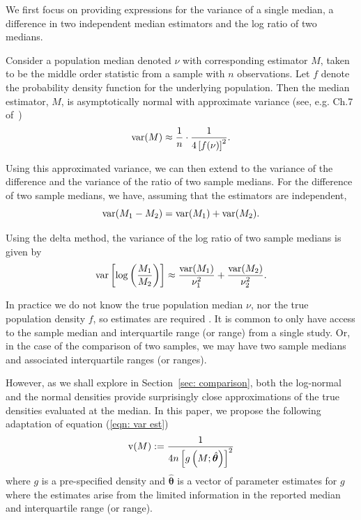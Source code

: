 \documentclass{article}
\begin{document}
We first focus on providing expressions for the variance of a single median, a difference in two independent median estimators and the log ratio of two medians.

Consider a population median denoted $\nu$ with corresponding estimator $M$, taken to be the middle order statistic from a sample with $n$ observations.  Let $f$ denote the probability density function for the underlying population.  Then the median estimator, $M$, is asymptotically normal with approximate variance (see, e.g. Ch.7 of~\cite{dasgupta2008asymptotic})
\begin{equation}\label{eqn: var est}
\operatorname{var}(M)\approx \frac{1}{n}\cdot\frac{1}{4\left[f(\nu)\right]^2}.
\end{equation}


Using this approximated variance, we can then extend to the variance of the difference and the variance of the ratio of two sample medians. For the difference of two sample medians, we have, assuming that the estimators are independent,
\begin{equation}\label{eqn: var diff}
\operatorname{var}(M_1-M_2) = \operatorname{var}(M_1) + \operatorname{var}(M_2).
\end{equation}

Using the delta method, the variance of the log ratio of two sample medians is given by
\begin{equation}\label{eqn: var lr}
\operatorname{var}\left[\log\left(\frac {M_1}{M_2 }\right)\right] \approx  \frac{\operatorname{var}(M_1)}{\nu_1^2}+ \frac{\operatorname{var}(M_2)} {\nu_2^2}.
\end{equation}

In practice we do not know the true population median $\nu$, nor the true population density $f$, so estimates are required . It is common to only have access to the sample median and interquartile range (or range) from a single study. Or, in the case of the comparison of two samples, we may have two sample medians and associated interquartile ranges (or ranges).

However, as we shall explore in Section~\ref{sec: comparison}, both the log-normal and the normal densities provide surprisingly close approximations of the true densities evaluated at the median.  In this paper, we propose the following adaptation of equation (\ref{eqn: var est})
\begin{equation} \label{eqn: varmed}
\operatorname{v}(M) := \frac 1 {4n\left[ g\left(M; \hat{\bm \theta}\right)\right]^2}
\end{equation}
where $g$ is a pre-specified density and $\hat{\bm \theta}$ is a vector of parameter estimates for $g$ where the estimates arise from the limited information in the reported median and interquartile range (or range).
\end{document}
